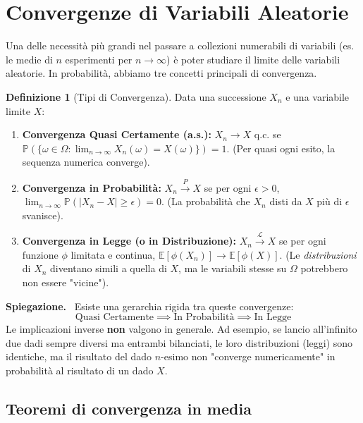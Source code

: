 \documentclass[11pt, a4paper]{report}
\theoremstyle{plain}
\theoremstyle{definition}
\newtheorem{definition}[theorem]{Definizione}
\theoremstyle{remark}
\newenvironment{spiegazione}[1][Spiegazione]
{\begin{mdframed}[backgroundcolor=green!5, linecolor=green!50, linewidth=2pt, topline=false, rightline=false, bottomline=false]
\textbf{\textsf{#1.}}\ }
{\end{mdframed}}
\newcommand{\PP}{\mathbb{P}}
\newcommand{\E}{\mathbb{E}}
\newcommand{\1}{\mathbf{1}}
\begin{document}
\section{Convergenze di Variabili Aleatorie}

Una delle necessità più grandi nel passare a collezioni numerabili di variabili (es. le medie di $n$ esperimenti per $n \to \infty$) è poter studiare il limite delle variabili aleatorie.
In probabilità, abbiamo tre concetti principali di convergenza.

\begin{definition}[Tipi di Convergenza]
Data una successione $X_n$ e una variabile limite $X$:
\begin{enumerate}
    \item \textbf{Convergenza Quasi Certamente (a.s.):} $X_n \to X$ q.c. se $\PP(\{\omega \in \Omega : \lim_{n\to\infty} X_n(\omega) = X(\omega)\}) = 1$. (Per quasi ogni esito, la sequenza numerica converge).
    \item \textbf{Convergenza in Probabilità:} $X_n \stackrel{P}{\to} X$ se per ogni $\epsilon > 0$, $\lim_{n\to\infty} \PP(|X_n - X| \ge \epsilon) = 0$. (La probabilità che $X_n$ disti da $X$ più di $\epsilon$ svanisce).
    \item \textbf{Convergenza in Legge (o in Distribuzione):} $X_n \stackrel{\mathcal{L}}{\to} X$ se per ogni funzione $\phi$ limitata e continua, $\E[\phi(X_n)] \to \E[\phi(X)]$. (Le \emph{distribuzioni} di $X_n$ diventano simili a quella di $X$, ma le variabili stesse su $\Omega$ potrebbero non essere "vicine").
\end{enumerate}
\end{definition}

\begin{spiegazione}
    Esiste una gerarchia rigida tra queste convergenze:
    \[ \text{Quasi Certamente} \implies \text{In Probabilità} \implies \text{In Legge} \]
    Le implicazioni inverse \textbf{non} valgono in generale. 
    Ad esempio, se lancio all'infinito due dadi sempre diversi ma entrambi bilanciati, le loro distribuzioni (leggi) sono identiche, ma il risultato del dado $n$-esimo non "converge numericamente" in probabilità al risultato di un dado $X$.
\end{spiegazione}

\subsection{Teoremi di convergenza in media}
\end{document}
